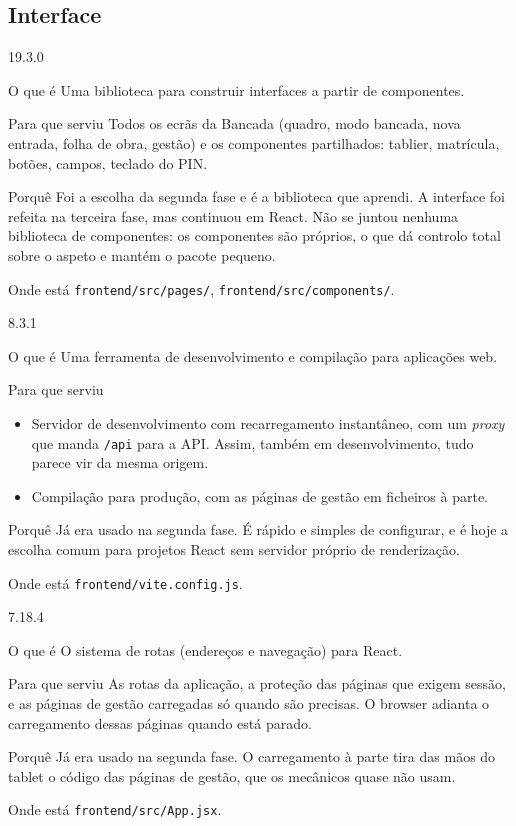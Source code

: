 \documentclass[a4paper,12pt]{article}
\newenvironment{ficha}[2]{%
  \par\needspace{7\baselineskip}\medskip\noindent{\large\bfseries #1}\hfill{\small\color{gray!70!black}#2}\par\nopagebreak\smallskip
  \begin{description}[leftmargin=3.1cm,labelwidth=2.8cm,labelsep=0.3cm,font=\normalfont\bfseries\small,itemsep=2pt,topsep=2pt,before=\raggedright]
}{\end{description}\medskip}
\begin{document}
\subsection{Interface}

\begin{ficha}{React 19}{19.3.0}
  \item[O que é] Uma biblioteca para construir interfaces a partir de componentes.
  \item[Para que serviu] Todos os ecrãs da Bancada (quadro, modo bancada, nova entrada, folha de obra, gestão) e os componentes partilhados: tablier, matrícula, botões, campos, teclado do PIN.
  \item[Porquê] Foi a escolha da segunda fase e é a biblioteca que aprendi. A interface foi refeita na terceira fase, mas continuou em React. Não se juntou nenhuma biblioteca de componentes: os componentes são próprios, o que dá controlo total sobre o aspeto e mantém o pacote pequeno.
  \item[Onde está] \texttt{frontend/src/pages/}, \texttt{frontend/src/components/}.
\end{ficha}

\begin{ficha}{Vite 8}{8.3.1}
  \item[O que é] Uma ferramenta de desenvolvimento e compilação para aplicações web.
  \item[Para que serviu]
  \begin{itemize}
    \item Servidor de desenvolvimento com recarregamento instantâneo, com um \textit{proxy} que manda \texttt{/api} para a API. Assim, também em desenvolvimento, tudo parece vir da mesma origem.
    \item Compilação para produção, com as páginas de gestão em ficheiros à parte.
  \end{itemize}
  \item[Porquê] Já era usado na segunda fase. É rápido e simples de configurar, e é hoje a escolha comum para projetos React sem servidor próprio de renderização.
  \item[Onde está] \texttt{frontend/vite.config.js}.
\end{ficha}

\begin{ficha}{React Router 7}{7.18.4}
  \item[O que é] O sistema de rotas (endereços e navegação) para React.
  \item[Para que serviu] As rotas da aplicação, a proteção das páginas que exigem sessão, e as páginas de gestão carregadas só quando são precisas. O browser adianta o carregamento dessas páginas quando está parado.
  \item[Porquê] Já era usado na segunda fase. O carregamento à parte tira das mãos do tablet o código das páginas de gestão, que os mecânicos quase não usam.
  \item[Onde está] \texttt{frontend/src/App.jsx}.
\end{ficha}
\end{document}
